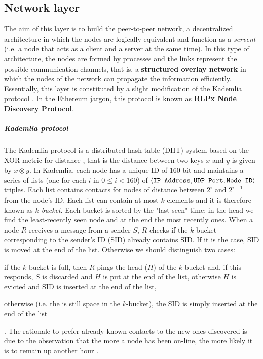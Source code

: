 \subsection{Network layer}
\label{sec:network-layer}

The aim of this layer is to build the peer-to-peer network, a decentralized
architecture in which the nodes are logically equivalent and function as a
\emph{servent} (i.e. a node that acts as a client and a server at the same
time). In this type of architecture, the nodes are formed by processes and the
links represent the possible communication channels, that is, a
\textbf{structured overlay network} \cite{van2017distributed} in which the nodes
of the network can propagate the information efficiently. Essentially, this
layer is constituted by a slight modification of the Kademlia protocol
\cite{bib:kademlia}. In the Ethereum jargon, this protocol is known as
\textbf{RLPx Node Discovery Protocol}.


\subparagraph{Kademlia protocol}
The Kademlia protocol is a distributed hash table (DHT) system based on the
XOR-metric for distance \cite{bib:kademlia}, that is the distance between two
keys $x$ and $y$ is given by $x \otimes y$. In Kademlia, each node has a unique
ID of 160-bit and maintains a series of lists (one for each $i$ in $0 \leq i <
160$) of $\langle \verb|IP Address|, \verb|UDP Port|, \verb|Node ID| \rangle$
triples. Each list contains contacts for nodes of distance between $2^i$ and
$2^{i+1}$ from the node's ID. Each list can contain at most $k$ elements and it
is therefore known as \textit{$k$-bucket}. Each bucket is sorted by the "last
seen" time: in the head we find the least-recently seen node and at the end the
most recently ones. When a node $R$ receives a message from a sender $S$, $R$
checks if the $k$-bucket corresponding to the sender's ID (SID) already contains
SID. If it is the case, SID is moved at the end of the list. Otherwise we should
distinguish two cases:
\begin{enumerate*}[label=(\arabic*)]
  \item if the $k$-bucket is full, then $R$ pings the head ($H$) of the
  $k$-bucket and, if this responds, $S$ is discarded and $H$ is put at the end
  of the list, otherwise $H$ is evicted and SID is inserted at the end of the
  list,
  \item otherwise (i.e. the is still space in the $k$-bucket), the SID is simply
  inserted at the end of the list
\end{enumerate*}.
The rationale to prefer already known contacts to the new ones discovered is due
to the observation that the more a node has been on-line, the more likely it is
to remain up another hour \cite{bib:kademlia}.

